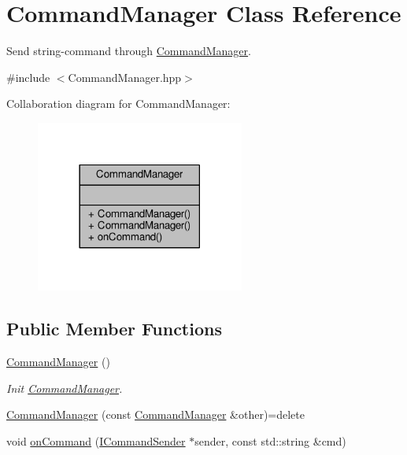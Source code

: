 \hypertarget{class_command_manager}{\section{Command\-Manager Class Reference}
\label{class_command_manager}
}


Send string-\/command through \hyperlink{class_command_manager}{Command\-Manager}.  




{\ttfamily \#include $<$Command\-Manager.\-hpp$>$}



Collaboration diagram for Command\-Manager\-:
\nopagebreak
\begin{figure}[H]
\begin{center}
\leavevmode
\includegraphics[width=194pt]{class_command_manager__coll__graph}
\end{center}
\end{figure}
\subsection*{Public Member Functions}
\begin{DoxyCompactItemize}
\item 
\hyperlink{class_command_manager_a8a13226bf933396a3f35dfb5bee3e813}{Command\-Manager} ()
\begin{DoxyCompactList}\small\item\em Init \hyperlink{class_command_manager}{Command\-Manager}. \end{DoxyCompactList}\item 
\hyperlink{class_command_manager_aeaffe7fa7dd8f1dd45b642120013a076}{Command\-Manager} (const \hyperlink{class_command_manager}{Command\-Manager} \&other)=delete
\item 
void \hyperlink{class_command_manager_abef8721bbe32e1ecb22f2f3d3b8c0601}{on\-Command} (\hyperlink{class_i_command_sender}{I\-Command\-Sender} $\ast$sender, const std\-::string \&cmd)
\end{DoxyCompactItemize}


